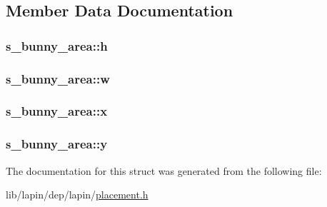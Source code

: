 \subsection{Member Data Documentation}
\hypertarget{structs__bunny__area_aa0740370ea4c890facdd2e67c43cc4e3}{
\subsubsection[{h}]{ s\-\_\-bunny\-\_\-area\-::h}}\label{structs__bunny__area_aa0740370ea4c890facdd2e67c43cc4e3}
\hypertarget{structs__bunny__area_a419110d4524d2136e4ad831e3f2dc2c3}{
\subsubsection[{w}]{ s\-\_\-bunny\-\_\-area\-::w}}\label{structs__bunny__area_a419110d4524d2136e4ad831e3f2dc2c3}
\hypertarget{structs__bunny__area_a25101bc0ca48ec8caed94af508b995a9}{
\subsubsection[{x}]{ s\-\_\-bunny\-\_\-area\-::x}}\label{structs__bunny__area_a25101bc0ca48ec8caed94af508b995a9}
\hypertarget{structs__bunny__area_a066f5e2f71ddf36fed5223e528f88756}{
\subsubsection[{y}]{ s\-\_\-bunny\-\_\-area\-::y}}\label{structs__bunny__area_a066f5e2f71ddf36fed5223e528f88756}


The documentation for this struct was generated from the following file\-:\begin{DoxyCompactItemize}
\item 
lib/lapin/dep/lapin/\hyperlink{placement_8h}{placement.\-h}\end{DoxyCompactItemize}
